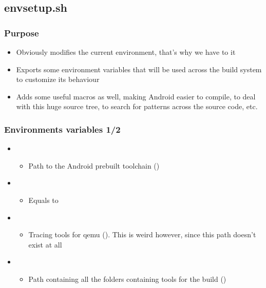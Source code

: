 \subsection{envsetup.sh}

\begin{frame}
  \frametitle{Purpose}
  \begin{itemize}
  \item Obviously modifies the current environment, that's why we have
    to  it
  \item Exports some environment variables that will be used across
    the build system to customize its behaviour
  \item Adds some useful macros as well, making Android easier to compile,
    to deal with this huge source tree, to search for patterns
    across the source code, etc.
  \end{itemize}
\end{frame}

\begin{frame}
  \frametitle{Environments variables 1/2}
  \begin{itemize}
  \item {}
    \begin{itemize}
    \item Path to the Android prebuilt toolchain
      ()
    \end{itemize}
  \item {}
    \begin{itemize}
    \item Equals to 
    \end{itemize}
  \item {}
    \begin{itemize}
    \item Tracing tools for qemu
      (). This is weird however,
      since this path doesn't exist at all
    \end{itemize}
  \item {}
    \begin{itemize}
    \item Path containing all the folders containing tools for the
      build
      ()
    \end{itemize}
  \end{itemize}
\end{frame}


